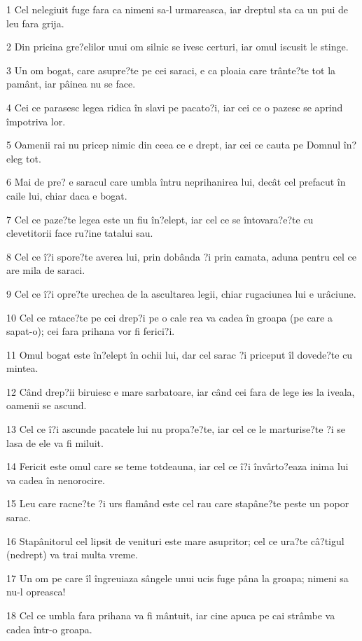 \par 1 Cel nelegiuit fuge fara ca nimeni sa-l urmareasca, iar dreptul sta ca un pui de leu fara grija.
\par 2 Din pricina gre?elilor unui om silnic se ivesc certuri, iar omul iscusit le stinge.
\par 3 Un om bogat, care asupre?te pe cei saraci, e ca ploaia care trânte?te tot la pamânt, iar pâinea nu se face.
\par 4 Cei ce parasesc legea ridica în slavi pe pacato?i, iar cei ce o pazesc se aprind împotriva lor.
\par 5 Oamenii rai nu pricep nimic din ceea ce e drept, iar cei ce cauta pe Domnul în?eleg tot.
\par 6 Mai de pre? e saracul care umbla întru neprihanirea lui, decât cel prefacut în caile lui, chiar daca e bogat.
\par 7 Cel ce paze?te legea este un fiu în?elept, iar cel ce se întovara?e?te cu clevetitorii face ru?ine tatalui sau.
\par 8 Cel ce î?i spore?te averea lui, prin dobânda ?i prin camata, aduna pentru cel ce are mila de saraci.
\par 9 Cel ce î?i opre?te urechea de la ascultarea legii, chiar rugaciunea lui e urâciune.
\par 10 Cel ce ratace?te pe cei drep?i pe o cale rea va cadea în groapa (pe care a sapat-o); cei fara prihana vor fi ferici?i.
\par 11 Omul bogat este în?elept în ochii lui, dar cel sarac ?i priceput îl dovede?te cu mintea.
\par 12 Când drep?ii biruiesc e mare sarbatoare, iar când cei fara de lege ies la iveala, oamenii se ascund.
\par 13 Cel ce î?i ascunde pacatele lui nu propa?e?te, iar cel ce le marturise?te ?i se lasa de ele va fi miluit.
\par 14 Fericit este omul care se teme totdeauna, iar cel ce î?i învârto?eaza inima lui va cadea în nenorocire.
\par 15 Leu care racne?te ?i urs flamând este cel rau care stapâne?te peste un popor sarac.
\par 16 Stapânitorul cel lipsit de venituri este mare asupritor; cel ce ura?te câ?tigul (nedrept) va trai multa vreme.
\par 17 Un om pe care îl îngreuiaza sângele unui ucis fuge pâna la groapa; nimeni sa nu-l opreasca!
\par 18 Cel ce umbla fara prihana va fi mântuit, iar cine apuca pe cai strâmbe va cadea într-o groapa.
